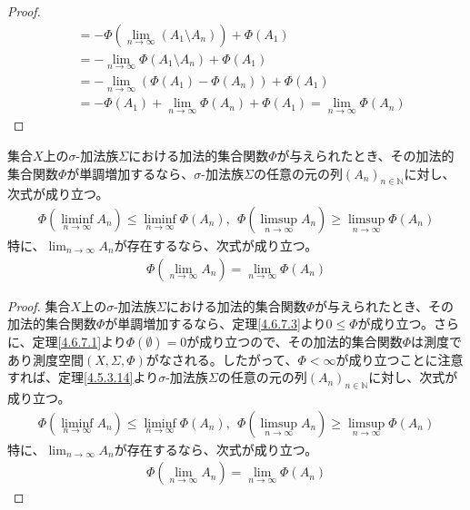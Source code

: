\documentclass[dvipdfmx]{jsarticle}
\begin{document}
\begin{proof}
\begin{align*}
&= - \varPhi\left( \lim_{n \rightarrow \infty}\left( A_{1} \setminus A_{n} \right) \right) + \varPhi\left( A_{1} \right)\\
&= - \lim_{n \rightarrow \infty}{\varPhi\left( A_{1} \setminus A_{n} \right)} + \varPhi\left( A_{1} \right)\\
&= - \lim_{n \rightarrow \infty}\left( \varPhi\left( A_{1} \right) - \varPhi\left( A_{n} \right) \right) + \varPhi\left( A_{1} \right)\\
&= - \varPhi\left( A_{1} \right) + \lim_{n \rightarrow \infty}{\varPhi\left( A_{n} \right)} + \varPhi\left( A_{1} \right) = \lim_{n \rightarrow \infty}{\varPhi\left( A_{n} \right)}
\end{align*}
\end{proof}
\begin{thm}\label{4.6.7.6}
集合$X$上の$\sigma$-加法族$\varSigma$における加法的集合関数$\varPhi$が与えられたとき、その加法的集合関数$\varPhi$が単調増加するなら、$\sigma$-加法族$\varSigma$の任意の元の列$\left( A_{n} \right)_{n \in \mathbb{N}}$に対し、次式が成り立つ。
\begin{align*}
\varPhi\left( \liminf_{n \rightarrow \infty}A_{n} \right) \leq \liminf_{n \rightarrow \infty}{\varPhi\left( A_{n} \right)},\ \ \varPhi\left( \limsup_{n \rightarrow \infty}A_{n} \right) \geq \limsup_{n \rightarrow \infty}{\varPhi\left( A_{n} \right)}
\end{align*}
特に、$\lim_{n \rightarrow \infty}A_{n}$が存在するなら、次式が成り立つ。
\begin{align*}
\varPhi\left( \lim_{n \rightarrow \infty}A_{n} \right) = \lim_{n \rightarrow \infty}{\varPhi\left( A_{n} \right)}
\end{align*}
\end{thm}
\begin{proof}
集合$X$上の$\sigma$-加法族$\varSigma$における加法的集合関数$\varPhi$が与えられたとき、その加法的集合関数$\varPhi$が単調増加するなら、定理\ref{4.6.7.3}より$0 \leq \varPhi$が成り立つ。さらに、定理\ref{4.6.7.1}より$\varPhi(\emptyset) = 0$が成り立つので、その加法的集合関数$\varPhi$は測度であり測度空間$(X,\varSigma,\varPhi)$がなされる。したがって、$\varPhi < \infty$が成り立つことに注意すれば、定理\ref{4.5.3.14}より$\sigma$-加法族$\varSigma$の任意の元の列$\left( A_{n} \right)_{n \in \mathbb{N}}$に対し、次式が成り立つ。
\begin{align*}
\varPhi\left( \liminf_{n \rightarrow \infty}A_{n} \right) \leq \liminf_{n \rightarrow \infty}{\varPhi\left( A_{n} \right)},\ \ \varPhi\left( \limsup_{n \rightarrow \infty}A_{n} \right) \geq \limsup_{n \rightarrow \infty}{\varPhi\left( A_{n} \right)}
\end{align*}
特に、$\lim_{n \rightarrow \infty}A_{n}$が存在するなら、次式が成り立つ。
\begin{align*}
\varPhi\left( \lim_{n \rightarrow \infty}A_{n} \right) = \lim_{n \rightarrow \infty}{\varPhi\left( A_{n} \right)}
\end{align*}
\end{proof}
\end{document}
